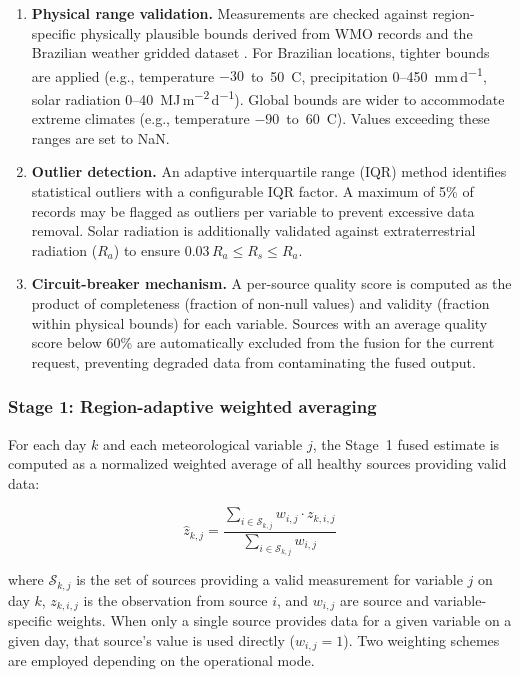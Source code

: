 \documentclass[preprint,review,12pt]{elsarticle}
\begin{document}
\begin{enumerate}
\item \textbf{Physical range validation.} Measurements are checked against
  region-specific physically plausible bounds derived from WMO records and
  the Brazilian weather gridded dataset \citep{Xavier2016, Xavier2022}. For
  Brazilian locations, tighter bounds are applied (e.g., temperature
  $-30$~to~50~\textdegree{}C, precipitation 0--450~mm\,d\textsuperscript{$-1$},
  solar radiation 0--40~MJ\,m\textsuperscript{$-2$}\,d\textsuperscript{$-1$}).
  Global bounds are wider to accommodate extreme climates (e.g., temperature
  $-90$~to~60~\textdegree{}C). Values exceeding these ranges are set to NaN.

\item \textbf{Outlier detection.} An adaptive interquartile range (IQR) method
  identifies statistical outliers with a configurable IQR factor. A maximum of
  5\% of records may be flagged as outliers per variable to prevent excessive
  data removal. Solar radiation is additionally validated against
  extraterrestrial radiation ($R_a$) to ensure $0.03\,R_a \leq R_s \leq R_a$.

\item \textbf{Circuit-breaker mechanism.} A per-source quality score is
  computed as the product of completeness (fraction of non-null values) and
  validity (fraction within physical bounds) for each variable. Sources with an
  average quality score below 60\% are automatically excluded from the fusion
  for the current request, preventing degraded data from contaminating the
  fused output.
\end{enumerate}

\subsubsection*{Stage 1: Region-adaptive weighted averaging}

For each day $k$ and each meteorological variable $j$, the Stage~1 fused
estimate is computed as a normalized weighted average of all healthy sources
providing valid data:

\begin{equation}
\hat{z}_{k,j} = \frac{\sum_{i \in \mathcal{S}_{k,j}} w_{i,j} \cdot z_{k,i,j}}{\sum_{i \in \mathcal{S}_{k,j}} w_{i,j}}
\label{eq:weighted_avg}
\end{equation}

\noindent where $\mathcal{S}_{k,j}$ is the set of sources providing a valid
measurement for variable $j$ on day $k$, $z_{k,i,j}$ is the observation from
source $i$, and $w_{i,j}$ are source and variable-specific weights.
When only a single source provides data for a given variable on a given day,
that source's value is used directly ($w_{i,j} = 1$). Two weighting schemes
are employed depending on the operational mode.
\end{document}
